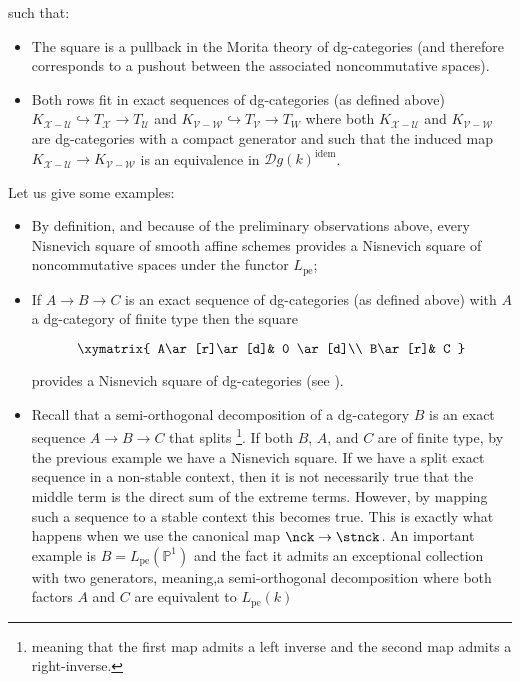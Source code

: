\begin{refsection}
\begin{defin}
\noindent such that:
\begin{itemize}
\item The square is a pullback in the Morita theory of dg-categories (and therefore corresponds to a pushout between the associated noncommutative spaces).
\item Both rows fit in exact sequences of dg-categories (as defined above) $K_{\mathcal X-\mathcal U}\hookrightarrow T_{\mathcal X}\to T_{\mathcal U}$ and  $K_{\mathcal V-\mathcal W}\hookrightarrow T_{\mathcal V}\to T_{W}$ where both $K_{\mathcal X-\mathcal U}$ and $K_{\mathcal V-\mathcal W}$ are dg-categories with a compact generator and such that the induced map $K_{\mathcal X-\mathcal U}\to K_{\mathcal V-\mathcal W}$ is an equivalence in $\mathcal{D}g(k)^\mathrm{idem}$.
\end{itemize}
\end{defin}

Let us give some examples:

\begin{example}
\hfill
\begin{itemize}
\item By definition, and because of the preliminary observations above, every Nisnevich square of smooth affine schemes provides a Nisnevich square of noncommutative spaces under the functor $L_\mathrm{pe}$;
\item If $A\to B \to C$ is an exact sequence of dg-categories (as defined above) with $A$ a dg-category of finite type then the square

$$
\xymatrix{
A\ar[r]\ar[d]& 0 \ar[d]\\
B\ar[r]& C
}
$$

\noindent provides a Nisnevich square of dg-categories (see \cite[6.47]{nc1}).
\item Recall that a semi-orthogonal decomposition of a dg-category $B$ is an exact sequence $A\to B\to C$ that splits \footnote{meaning that the first map admits a left inverse and the second map admits a right-inverse.}. If both $B$, $A$, and $C$ are of finite type, by the previous example we have a Nisnevich square. If we have a split exact sequence in a non-stable context, then it is not necessarily true that the middle term is the direct sum of the extreme terms. However, by mapping such a sequence to a stable context this becomes true. This is exactly what happens when we use the canonical map $\nck\to \stnck$. An important example is $B= L_\mathrm{pe}(\mathbb{P}^1)$ and the fact it admits an exceptional collection with two generators, meaning,a semi-orthogonal decomposition where both factors $A$ and $C$ are equivalent to $L_\mathrm{pe}(k)$
\end{itemize}
\end{example}


\end{refsection}
